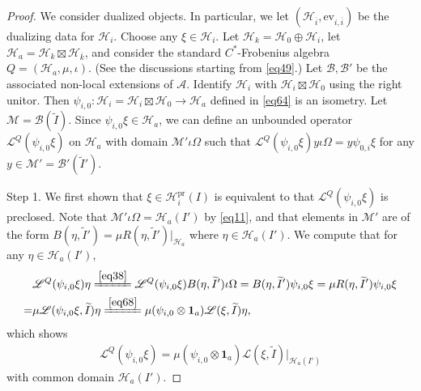 \documentclass[12pt,a4paper]{article}
\theoremstyle{definition}
\theoremstyle{plain}
\newcommand{\mc}{\mathcal}
\newcommand{\wtd}{\widetilde}
\newcommand{\ovl}{\overline}
\newcommand{\id}{\mathbf{1}}
\newcommand{\ev}{\mathrm{ev}}
\newcommand{\scr}{\mathscr}
\newcommand{\pr}{\mathrm{pr}}
\numberwithin{equation}{section}
\begin{document}
\begin{proof}
We consider dualized objects. In particular, we let $(\mc H_{\ovl i},\ev_{i,\ovl i})$ be the dualizing data for $\mc H_i$. Choose any $\xi\in\mc H_i$. Let $\mc H_k=\mc H_0\oplus\mc H_i$, let $\mc H_a=\mc H_k\boxtimes\mc H_{\ovl k}$, and consider the standard $C^*$-Frobenius algebra $Q=(\mc H_a,\mu,\iota)$. (See the discussions starting from \eqref{eq49}.) Let $\mc B,\mc B'$ be the associated non-local extensions of $\mc A$.	Identify $\mc H_i$ with $\mc H_i\boxtimes\mc H_0$ using the right unitor. Then $\psi_{i,0}:\mc H_i=\mc H_i\boxtimes\mc H_0\rightarrow\mc H_a$ defined in \eqref{eq64} is an isometry. Let $\mc M=\mc B(\wtd I)$. Since $\psi_{i,0}\xi\in\mc H_a$, we can define an unbounded operator $\scr L^Q(\psi_{i,0}\xi)$ on $\mc H_a$ with domain $\mc M'\iota\Omega$ such that $\scr L^Q(\psi_{i,0}\xi)y\iota\Omega=y\psi_{0,i}\xi$ for any $y\in\mc M'=\mc B'(\wtd I')$. 

Step 1. We first shown that $\xi\in\mc H_i^\pr(I)$ is equivalent to that $\scr L^Q(\psi_{i,0}\xi)$ is preclosed.  Note that $\mc M'\iota\Omega=\mc H_a(I')$ by \eqref{eq11}, and that elements in $\mc M'$ are of the form $B(\eta,\wtd I')=\mu R(\eta,\wtd I')|_{\mc H_a}$ where $\eta\in\mc H_a(I')$.  We compute that for any $\eta\in\mc H_a(I')$,
\begin{align*}
&\scr L^Q(\psi_{i,0}\xi)\eta\xlongequal{\eqref{eq38}}\scr L^Q(\psi_{i,0}\xi)B(\eta,\wtd I')\iota\Omega=B(\eta,\wtd I')\psi_{i,0}\xi=\mu R(\eta,\wtd I')\psi_{i,0}\xi\\
=&\mu\scr L(\psi_{i,0}\xi,\wtd I)\eta\xlongequal{\eqref{eq68}}\mu(\psi_{i,0}\otimes\id_a)\scr L(\xi,\wtd I)\eta,
\end{align*}
which shows
\begin{align}
\scr L^Q(\psi_{i,0}\xi)=\mu(\psi_{i,0}\otimes\id_a)\scr L(\xi,\wtd I)|_{\mc H_a(I')}\label{eq46}
\end{align}
with common domain $\mc H_a(I')$.


\end{proof}
\end{document}
